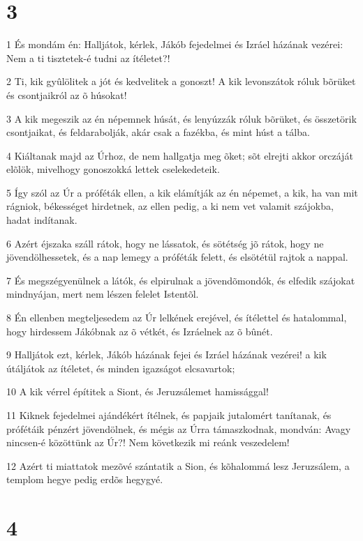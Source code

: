 \chapter{3}

\par 1 És mondám én: Halljátok, kérlek, Jákób fejedelmei és Izráel házának vezérei: Nem a ti tisztetek-é tudni az ítéletet?!
\par 2 Ti, kik gyûlölitek a jót és kedvelitek a gonoszt! A kik levonszátok róluk bõrüket és csontjaikról az õ húsokat!
\par 3 A kik megeszik az én népemnek húsát, és lenyúzzák róluk bõrüket, és összetörik csontjaikat, és feldarabolják, akár csak a fazékba, és mint húst a tálba.
\par 4 Kiáltanak majd az Úrhoz, de nem hallgatja meg õket; sõt elrejti akkor orczáját elõlök, mivelhogy gonoszokká lettek cselekedeteik.
\par 5 Így szól az Úr a próféták ellen, a kik elámítják az én népemet, a kik, ha van mit rágniok, békességet hirdetnek, az ellen pedig, a ki nem vet valamit szájokba, hadat indítanak.
\par 6 Azért éjszaka száll rátok, hogy ne lássatok, és sötétség jõ rátok, hogy ne jövendölhessetek, és a nap lemegy a próféták felett, és elsötétül rajtok a nappal.
\par 7 És megszégyenülnek a látók, és elpirulnak a jövendõmondók, és elfedik szájokat mindnyájan, mert nem lészen felelet Istentõl.
\par 8 Én ellenben megteljesedem az Úr lelkének erejével, és ítélettel és hatalommal, hogy hirdessem Jákóbnak az õ vétkét, és Izráelnek az õ bûnét.
\par 9 Halljátok ezt, kérlek, Jákób házának fejei és Izráel házának vezérei! a kik útáljátok az ítéletet, és minden igazságot elcsavartok;
\par 10 A kik vérrel építitek a Siont, és Jeruzsálemet hamissággal!
\par 11 Kiknek fejedelmei ajándékért ítélnek, és papjaik jutalomért tanítanak, és prófétáik pénzért jövendölnek,  és mégis az Úrra támaszkodnak, mondván: Avagy nincsen-é közöttünk az Úr?! Nem következik mi reánk veszedelem!
\par 12 Azért ti miattatok mezõvé szántatik a Sion, és kõhalommá lesz Jeruzsálem, a templom hegye pedig erdõs hegygyé.

\chapter{4}


